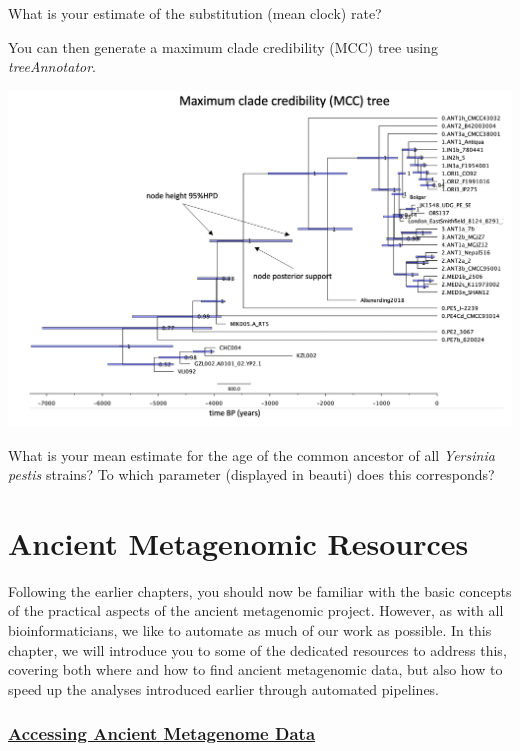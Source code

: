 \documentclass[
  letterpaper,
]{book}
\begin{document}
What is your estimate of the substitution (mean clock) rate?

You can then generate a maximum clade credibility (MCC) tree using
\emph{treeAnnotator}.

\includegraphics{assets/images/chapters/phylogenomics/MCC.png}

What is your mean estimate for the age of the common ancestor of all
\emph{Yersinia pestis} strains? To which parameter (displayed in beauti)
does this corresponds?

\part{Ancient Metagenomic Resources}

Following the earlier chapters, you should now be familiar with the
basic concepts of the practical aspects of the ancient metagenomic
project. However, as with all bioinformaticians, we like to automate as
much of our work as possible. In this chapter, we will introduce you to
some of the dedicated resources to address this, covering both where and
how to find ancient metagenomic data, but also how to speed up the
analyses introduced earlier through automated pipelines.

\hypertarget{accessing-ancient-metagenome-data}{%
\section*{\texorpdfstring{\protect\hyperlink{introduction-to-ancientmetagenomedir}{Accessing
Ancient Metagenome
Data}}{Accessing Ancient Metagenome Data}}\label{accessing-ancient-metagenome-data}}
\end{document}
